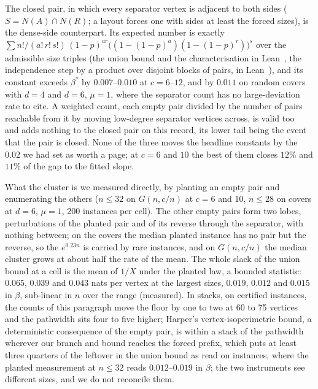 The closed pair, in which every separator vertex is adjacent to both sides
($S=N(A)\cap N(R)$; a layout forces one with sides at least the forced sizes),
is the dense-side counterpart. Its expected number is exactly
$\sum n!/(a!\,r!\,s!)\,(1-p)^{ar}\bigl((1-(1-p)^{a})(1-(1-p)^{r})\bigr)^{s}$ over
the admissible size triples (the union bound and the characterisation in
Lean~, the independence step by a product over disjoint
blocks of pairs, in Lean~), and its constant
exceeds $\beta^{*}$ by $0.007$--$0.010$ at $c=6$--$12$, and by $0.011$ on random
covers with $d=4$ and $d=6$, $\mu=1$, where the separator count has no
large-deviation rate to cite. A weighted count, each empty pair divided by the
number of pairs reachable from it by moving low-degree separator vertices
across, is valid too~ and adds nothing to the closed
pair on this record, its lower tail being the event that the pair is closed.
None of the three moves the headline constants by the $0.02$ we had set as
worth a page; at $c=6$ and $10$ the best of them closes $12\%$ and $11\%$ of
the gap to the fitted slope.

What the cluster is we measured directly, by planting an empty pair and
enumerating the others ($n\le32$ on $G(n,c/n)$ at $c=6$ and $10$, $n\le28$ on
covers at $d=6$, $\mu=1$, 200 instances per cell). The other empty pairs form
two lobes, perturbations of the planted pair and of its reverse through the
separator, with nothing between; on the covers the median planted instance
has no pair but the reverse, so the $e^{0.23n}$ is carried by rare instances,
and on $G(n,c/n)$ the median cluster grows at about half the rate of the mean.
The whole slack of the union bound at a cell is the mean of $1/X$ under the
planted law, a bounded statistic: $0.065$, $0.039$ and $0.043$ nats per vertex
at the largest sizes, $0.019$, $0.012$ and $0.015$ in $\beta$, sub-linear in
$n$ over the range (measured). In stacks, on certified instances, the counts
of this paragraph move the floor by one to two at 60 to 75 vertices and the
pathwidth sits four to five higher; Harper's vertex-isoperimetric bound, a
deterministic consequence of the empty pair, is within a stack of the
pathwidth wherever our branch and bound reaches the forced prefix, which puts
at least three quarters of the leftover in the union bound as read on
instances, where the planted measurement at $n\le32$ reads $0.012$--$0.019$ in
$\beta$; the two instruments see different sizes, and we do not reconcile
them.

